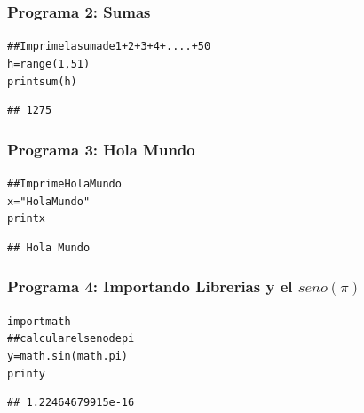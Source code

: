 \documentclass{article}\usepackage[]{graphicx}\usepackage[]{color}
\makeatletter
\newenvironment{kframe}{%
 \def\at@end@of@kframe{}%
 \ifinner\ifhmode%
  \def\at@end@of@kframe{\end{minipage}}%
  \begin{minipage}{\columnwidth}%
 \fi\fi%
 \def\FrameCommand##1{\hskip\@totalleftmargin \hskip-\fboxsep
 \colorbox{shadecolor}{##1}\hskip-\fboxsep
     \hskip-\linewidth \hskip-\@totalleftmargin \hskip\columnwidth}%
 \MakeFramed {\advance\hsize-\width
   \@totalleftmargin\z@ \linewidth\hsize
   \@setminipage}}%
 {\par\unskip\endMakeFramed%
 \at@end@of@kframe}
\newenvironment{knitrout}{}{} %
\makeatother
\begin{document}
\subsubsection*{Programa 2: Sumas}
\begin{knitrout}
\color{fgcolor}\begin{kframe}
\begin{alltt}
## Imprime la suma de 1+2+3+4+....+50
h = range(1, 51)
print sum(h)
\end{alltt}

\begin{verbatim}
## 1275
\end{verbatim}
\end{kframe}
\end{knitrout}

\subsubsection*{Programa 3: Hola Mundo}
\begin{knitrout}
\color{fgcolor}\begin{kframe}
\begin{alltt}
## Imprime Hola Mundo
x= "Hola Mundo"
print x
\end{alltt}

\begin{verbatim}
## Hola Mundo
\end{verbatim}
\end{kframe}
\end{knitrout}

\subsubsection*{Programa 4: Importando Librerias y el $seno(\pi)$}
\begin{knitrout}
\color{fgcolor}\begin{kframe}
\begin{alltt}
import math
## calcular el seno de pi
y= math.sin(math.pi)
print y
\end{alltt}

\begin{verbatim}
## 1.22464679915e-16
\end{verbatim}
\end{kframe}
\end{knitrout}
\end{document}
